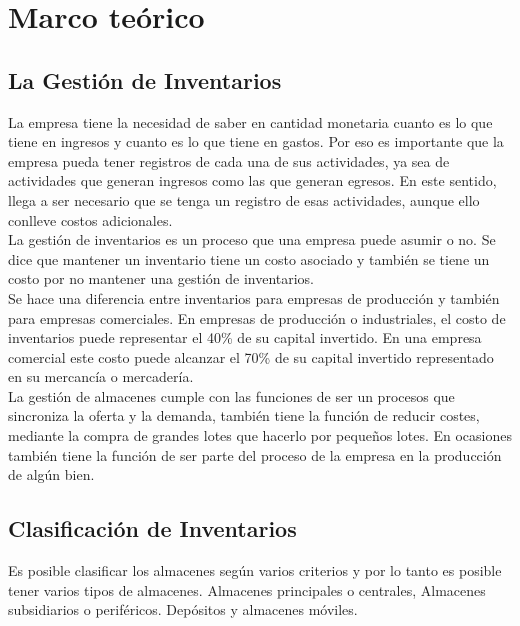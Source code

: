 

\chapter{Marco teórico}
\section{La Gestión de Inventarios}

La empresa tiene la necesidad de saber en cantidad monetaria cuanto es lo que tiene en ingresos y cuanto es lo que tiene en gastos. Por eso es importante que la empresa pueda tener registros de cada una de sus actividades, ya sea de actividades que generan ingresos como las que generan egresos. En este sentido, llega a ser necesario que se tenga un registro de esas actividades, aunque ello conlleve costos adicionales. \citep{FundGeInv}\\

La gestión de inventarios es un proceso que una empresa puede asumir o no. Se dice que mantener un inventario tiene un costo asociado y también se tiene un costo por no mantener una gestión de inventarios. \citep{FundGeInv}\\

Se hace una diferencia entre inventarios para empresas de producción y también para empresas comerciales. En empresas de producción o industriales, el costo de inventarios puede representar el 40\% de su capital invertido. En una empresa comercial este costo puede alcanzar el 70\% de su capital invertido representado en su mercancía o mercadería. \citep{FundGeInv}\\

La gestión de almacenes cumple con las funciones de ser un procesos que sincroniza la oferta y la demanda, también tiene la función de reducir costes, mediante la compra de grandes lotes que hacerlo por pequeños lotes. En ocasiones también tiene la función de ser parte del proceso de la empresa en la producción de algún bien. \citep{FundGeInv}

\section{Clasificación de Inventarios}

Es posible clasificar los almacenes según varios criterios y por lo tanto es posible tener varios tipos de almacenes.  Almacenes principales o centrales,  Almacenes subsidiarios o periféricos. Depósitos y almacenes móviles.

